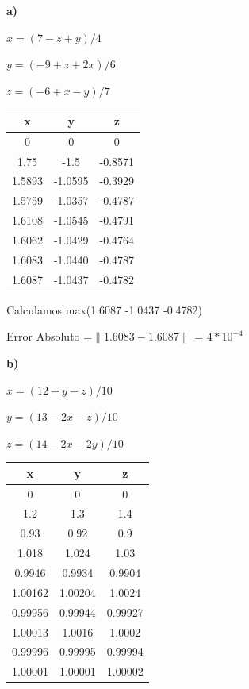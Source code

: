 \documentclass[12pt]{article}
\begin{document}
\textbf{a)}

$x = (7-z+y)/4$

$y = (-9+z+2x)/6$

$z = (-6+x-y)/7$

\begin{center}
\begin{tabular}{|c|c|c|}

\hline
x & y& z\\
\hline
0    & 0    & 0   \\
1.75   & -1.5    & -0.8571    \\
1.5893   & -1.0595    & -0.3929    \\
1.5759   & -1.0357    & -0.4787   \\
1.6108   & -1.0545    & -0.4791    \\
1.6062   & -1.0429    & -0.4764    \\
1.6083   & -1.0440    & -0.4787    \\
1.6087   & -1.0437    & -0.4782    \\
\hline
\end{tabular}
\end{center}

Calculamos max(1.6087   -1.0437    -0.4782)

Error Absoluto =$ \| 1.6083 - 1.6087\|$  = $4*10^{-4}$


\textbf{b)}

$x = (12-y-z)/10$

$y = (13-2x-z)/10$

$z = (14-2x-2y)/10$

\begin{center}
\begin{tabular}{|c|c|c|}

\hline
x & y& z\\
\hline
0    & 0    & 0   \\
1.2   & 1.3    & 1.4    \\
0.93   & 0.92    & 0.9    \\
1.018   & 1.024    & 1.03    \\
0.9946   & 0.9934    & 0.9904   \\
1.00162   & 1.00204    & 1.0024    \\
0.99956   & 0.99944   & 0.99927    \\
1.00013   & 1.0016    & 1.0002    \\
0.99996   & 0.99995    & 0.99994    \\
1.00001   & 1.00001    & 1.00002   \\
\hline
\end{tabular}
\end{center}
\end{document}
